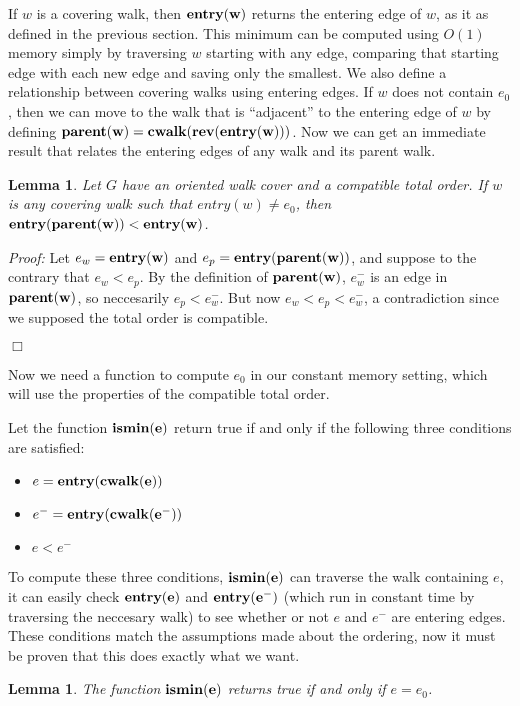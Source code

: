 \documentclass[11pt]{article}
\newcommand{\rev}{\bf rev}
\newcommand{\cwalk}{\bf cwalk}
\newcommand{\entry}{\bf entry}
\newcommand{\parent}{\bf parent}
\newcommand{\ismin}{\bf ismin}
\newtheorem{lemma}[theorem]{Lemma}
\begin{document}
If $w$ is a covering walk, then 
$\entry(w)$ returns the entering edge of $w$, as it as defined in the previous section.  
This minimum can be computed using $O(1)$ memory 
simply by traversing $w$ starting with any edge, comparing that starting edge with each new edge and 
saving only the smallest.  We also define a relationship between covering walks using entering edges.  
If $w$ does not contain $e_0$, then we can move to the walk that is 
``adjacent'' to the entering edge of $w$ by defining $\parent(w) = \cwalk(\rev(\entry(w)))$.  
Now we can get an immediate result that relates the entering edges of any walk and its parent walk.

\begin{lemma}  
\label{lem-parent}
Let $G$ have an oriented walk cover and a compatible total 
order.  If $w$ is any covering walk such that $entry(w) \ne e_0$, 
then $\entry(\parent(w)) < \entry(w)$.  
\end{lemma}

\emph{Proof: }  Let $e_w = \entry(w)$ and $e_p = \entry(parent(w))$, and suppose to the 
contrary that $e_w < e_p$.  By the definition of $\parent(w)$, $e_w^-$ is an edge in $\parent(w)$, 
so neccesarily $e_p < e_w^-$.  But now $e_w < e_p < e_w^-$, a contradiction since 
we supposed the total order is compatible.\begin{flushright} $\Box$\end{flushright} 

Now we need a function to compute $e_0$ in our constant memory setting, which will use the properties 
of the compatible total order.  

Let the function $\ismin(e)$ return true if and only if the following three conditions are satisfied:
\begin{itemize}
\item $e = \entry(\cwalk(e))$
\item $e^- = \entry(\cwalk(e^-))$
\item $e < e^-$
\end{itemize}

To compute these three conditions, $\ismin(e)$ can traverse the walk containing $e$, it can easily check 
$\entry(e)$ and $\entry(e^-)$ (which run in constant time by traversing the neccesary walk) to see 
whether or not $e$ and $e^-$ are entering edges.  
These conditions match the assumptions made about the ordering, now it must be proven that this 
does exactly what we want.

\begin{lemma}
\label{lem-ismin}
The function $\ismin(e)$ returns true if and only if $e=e_0$.
\end{lemma}
\end{document}
